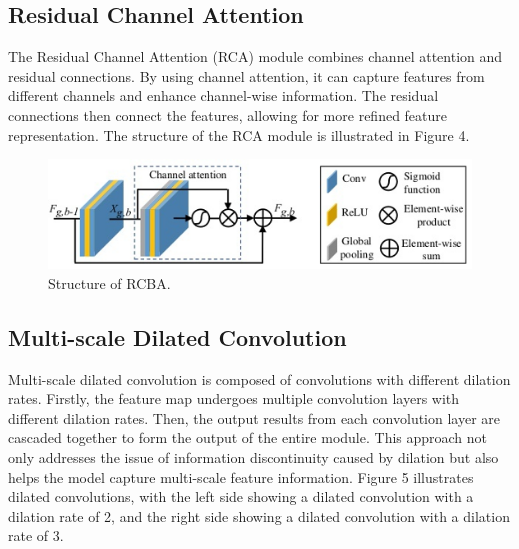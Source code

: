 \documentclass[10pt,twocolumn,a4paper]{article}
\begin{document}

\subsection{Residual Channel Attention}

The Residual Channel Attention (RCA)\cite{RCAB} module combines channel attention and residual connections. By using channel attention, it can capture features from different channels and enhance channel-wise information. The residual connections then connect the features, allowing for more refined feature representation. The structure of the RCA module is illustrated in Figure 4.

\begin{figure}[htbp]   %
	\centering
	\includegraphics[width=\linewidth,scale=1.00]{Images/RCBA.png}
	\caption{Structure of RCBA.}
	\label{fig:rcba}
\end{figure}


\subsection{Multi-scale Dilated Convolution}

Multi-scale dilated convolution\cite{MSD} is composed of convolutions with different dilation rates. Firstly, the feature map undergoes multiple convolution layers with different dilation rates. Then, the output results from each convolution layer are cascaded together to form the output of the entire module. This approach not only addresses the issue of information discontinuity caused by dilation but also helps the model capture multi-scale feature information. Figure 5 illustrates dilated convolutions, with the left side showing a dilated convolution with a dilation rate of 2, and the right side showing a dilated convolution with a dilation rate of 3.
\end{document}
